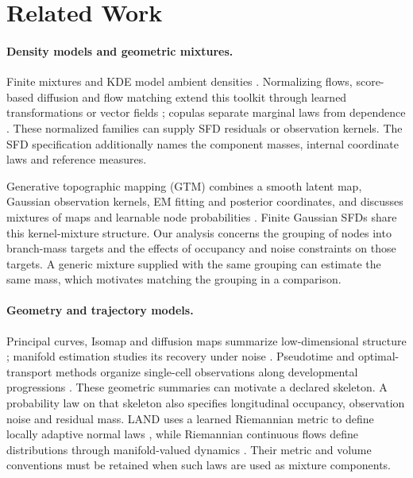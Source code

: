 \section{Related Work}
\label{sec:related-work}

\paragraph{Density models and geometric mixtures.}
Finite mixtures and KDE model ambient densities
\citep{mclachlan2000finite,silverman1986density}. Normalizing flows,
score-based diffusion and flow matching extend this toolkit through learned
transformations or vector fields
\citep{papamakarios2021normalizing,song2021score,lipman2023flow}; copulas
separate marginal laws from dependence \citep{nelsen2006copulas}.
These normalized families can supply SFD residuals or observation kernels.
The SFD specification additionally names the component masses, internal
coordinate laws and reference measures.

Generative topographic mapping (GTM) combines a smooth latent map,
Gaussian observation kernels, EM fitting and posterior coordinates, and
discusses mixtures of maps and learnable node probabilities
\citep{bishop1998gtm}. Finite Gaussian SFDs share this kernel-mixture
structure. Our analysis concerns the grouping of nodes into branch-mass
targets and the effects of occupancy and noise constraints on those targets.
A generic mixture supplied with the same grouping can estimate the same
mass, which motivates matching the grouping in a comparison.

\paragraph{Geometry and trajectory models.}
Principal curves, Isomap and diffusion maps summarize low-dimensional
structure \citep{hastie1989principal,tenenbaum2000isomap,coifman2006diffusion};
manifold estimation studies its recovery under noise
\citep{genovese2012manifold}. Pseudotime and optimal-transport methods organize
single-cell observations along developmental progressions
\citep{trapnell2014dynamics,schiebinger2019optimal}.
These geometric summaries can motivate a declared skeleton. A probability
law on that skeleton also specifies longitudinal occupancy, observation
noise and residual mass. LAND uses a learned Riemannian metric to define
locally adaptive normal laws \citep{arvanitidis2016land}, while Riemannian
continuous flows define distributions through manifold-valued dynamics
\citep{mathieu2020riemannian}. Their metric and volume conventions must be
retained when such laws are used as mixture components.

